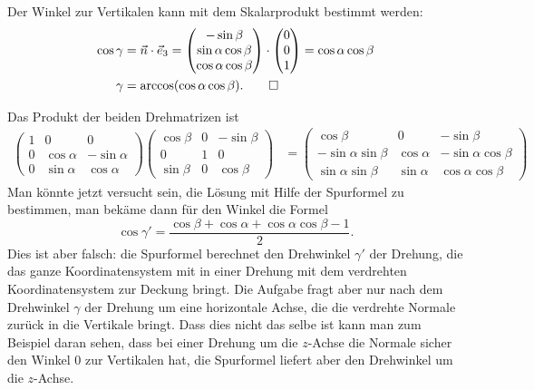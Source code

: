 \begin{loesung}
Der Winkel zur Vertikalen kann mit dem Skalarprodukt bestimmt
werden:
\begin{align*}
\cos\gamma
&=
\vec n\cdot\vec e_3=
\begin{pmatrix}
-\sin\beta\\
\sin\alpha\cos\beta\\
\cos\alpha\cos\beta
\end{pmatrix}
\cdot
\begin{pmatrix}0\\0\\1\end{pmatrix}=\cos\alpha\cos\beta
\\
\gamma&=\arccos(\cos\alpha\cos\beta).
\qedhere
\end{align*}
\end{loesung}

\begin{diskussion}
Das Produkt der beiden Drehmatrizen ist
\begin{align*}
\begin{pmatrix}
1&0&0\\
0&\cos\alpha&-\sin\alpha\\
0&\sin\alpha& \cos\alpha
\end{pmatrix}
\begin{pmatrix}
\cos\beta&0&-\sin\beta\\
0&1&0\\
\sin\beta&0&\cos\beta
\end{pmatrix}
&=
\begin{pmatrix}
\cos\beta           &0         &-\sin\beta\\
-\sin\alpha\sin\beta&\cos\alpha&-\sin\alpha\cos\beta\\
 \sin\alpha\sin\beta&\sin\alpha&\cos\alpha\cos\beta
\end{pmatrix}
\end{align*}
Man könnte jetzt versucht sein, die Lösung mit Hilfe der Spurformel
zu bestimmen, man bekäme dann für den Winkel die Formel
\[
\cos\gamma' = \frac{\cos\beta+\cos\alpha+\cos\alpha\cos\beta-1}{2}.
\]
Dies ist aber falsch: die Spurformel berechnet den Drehwinkel $\gamma'$
der Drehung,
die das ganze Koordinatensystem mit in einer Drehung mit dem verdrehten
Koordinatensystem zur Deckung bringt. Die Aufgabe fragt aber nur
nach dem Drehwinkel $\gamma$ der Drehung um eine horizontale Achse,
die die verdrehte Normale
zurück in die Vertikale bringt. Dass dies nicht das selbe ist kann
man zum Beispiel daran sehen, dass bei einer Drehung um die $z$-Achse 
die Normale sicher den Winkel 0 zur Vertikalen hat, die Spurformel
liefert aber den Drehwinkel um die $z$-Achse.
\end{diskussion}

